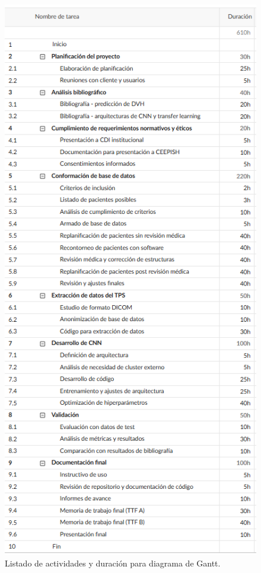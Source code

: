 \documentclass[
11pt, %
codirector, %
]{charter}
\begin{document}
\begin{figure}[htpb]
\centering 
\includegraphics[height=.7\textheight]{./Figuras/Fig4-Gantt.png}
\caption{Listado de actividades y duración para diagrama de Gantt.} %
\label{fig:diagGantt1}
\end{figure}
\end{document}
